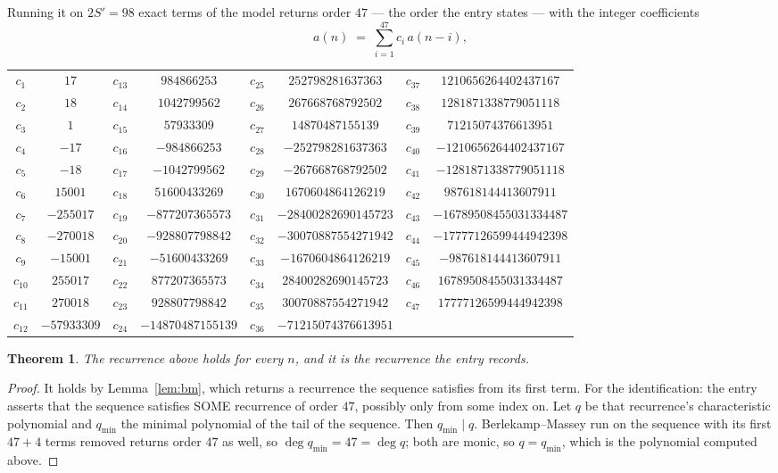 \documentclass[11pt,a4paper]{article}
\theoremstyle{plain}
\newtheorem{theorem}{Theorem}
\theoremstyle{definition}
\begin{document}
Running it on $2S'=98$ exact terms of the model returns order $47$ --- the order the
entry states --- with the integer coefficients
\[
a(n)\;=\;\sum_{i=1}^{47}c_i\,a(n-i),
\]
\begin{center}\small
\begin{tabular}{cccccccc}
$c_{1}$ & $17$ & $c_{13}$ & $984866253$ & $c_{25}$ & $252798281637363$ & $c_{37}$ & $1210656264402437167$ \\
$c_{2}$ & $18$ & $c_{14}$ & $1042799562$ & $c_{26}$ & $267668768792502$ & $c_{38}$ & $1281871338779051118$ \\
$c_{3}$ & $1$ & $c_{15}$ & $57933309$ & $c_{27}$ & $14870487155139$ & $c_{39}$ & $71215074376613951$ \\
$c_{4}$ & $-17$ & $c_{16}$ & $-984866253$ & $c_{28}$ & $-252798281637363$ & $c_{40}$ & $-1210656264402437167$ \\
$c_{5}$ & $-18$ & $c_{17}$ & $-1042799562$ & $c_{29}$ & $-267668768792502$ & $c_{41}$ & $-1281871338779051118$ \\
$c_{6}$ & $15001$ & $c_{18}$ & $51600433269$ & $c_{30}$ & $1670604864126219$ & $c_{42}$ & $987618144413607911$ \\
$c_{7}$ & $-255017$ & $c_{19}$ & $-877207365573$ & $c_{31}$ & $-28400282690145723$ & $c_{43}$ & $-16789508455031334487$ \\
$c_{8}$ & $-270018$ & $c_{20}$ & $-928807798842$ & $c_{32}$ & $-30070887554271942$ & $c_{44}$ & $-17777126599444942398$ \\
$c_{9}$ & $-15001$ & $c_{21}$ & $-51600433269$ & $c_{33}$ & $-1670604864126219$ & $c_{45}$ & $-987618144413607911$ \\
$c_{10}$ & $255017$ & $c_{22}$ & $877207365573$ & $c_{34}$ & $28400282690145723$ & $c_{46}$ & $16789508455031334487$ \\
$c_{11}$ & $270018$ & $c_{23}$ & $928807798842$ & $c_{35}$ & $30070887554271942$ & $c_{47}$ & $17777126599444942398$ \\
$c_{12}$ & $-57933309$ & $c_{24}$ & $-14870487155139$ & $c_{36}$ & $-71215074376613951$ &  &  \\
\end{tabular}
\end{center}

\begin{theorem}
The recurrence above holds for every $n$, and it is the recurrence the entry records.
\end{theorem}

\begin{proof}
It holds by Lemma~\ref{lem:bm}, which returns a recurrence the sequence satisfies from its
first term. For the identification: the entry asserts that the sequence satisfies SOME
recurrence of order $47$, possibly only from some index on. Let $q$ be that recurrence's
characteristic polynomial and $q_{\min}$ the minimal polynomial of the tail of the sequence.
Then $q_{\min}\mid q$. Berlekamp--Massey run on the sequence with its first $47+4$ terms
removed returns order $47$ as well, so $\deg q_{\min}=47=\deg q$; both are monic, so
$q=q_{\min}$, which is the polynomial computed above.
\end{proof}
\end{document}
